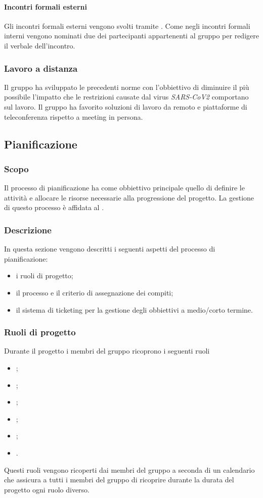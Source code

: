 \paragraph{Incontri formali esterni}
Gli incontri formali esterni vengono svolti tramite . Come negli incontri formali interni vengono nominati due dei partecipanti appartenenti al gruppo per redigere il verbale dell'incontro. 

\subsubsection{Lavoro a distanza}
Il gruppo ha sviluppato le precedenti norme con l'obbiettivo di diminuire il più possibile l'impatto che le restrizioni causate dal virus \textit{SARS-CoV2} comportano sul lavoro. Il gruppo ha favorito soluzioni di lavoro da remoto e piattaforme di teleconferenza rispetto a meeting in persona.

\subsection{Pianificazione}
\subsubsection{Scopo}
Il processo di pianificazione ha come obbiettivo principale quello di definire le attività e allocare le risorse necessarie alla progressione del progetto. La gestione di questo processo è affidata al \RdP{}.
\subsubsection{Descrizione}
In questa sezione vengono descritti i seguenti aspetti del processo di pianificazione:
\begin{itemize}
\item i ruoli di progetto;
\item il processo e il criterio di assegnazione dei compiti;
\item il sistema di ticketing per la gestione degli obbiettivi a medio/corto termine.
\end{itemize} 
\subsubsection{Ruoli di progetto}
Durante il progetto i membri del gruppo ricoprono i seguenti ruoli
\begin{itemize}
\item \RdP{};
\item \adm{};
\item \ana{};
\item \prog{};
\item \progr{};
\item \ver{}.
\end{itemize}
Questi ruoli vengono ricoperti dai membri del gruppo a seconda di un calendario che assicura a tutti i membri del gruppo di ricoprire durante la durata del progetto ogni ruolo diverso.


